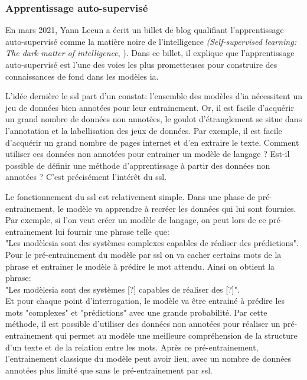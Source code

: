 \subsubsection{Apprentissage auto-supervisé}
En mars 2021, Yann Lecun a écrit un billet de blog qualifiant l'apprentissage auto-supervisé comme la matière noire de l'intelligence \textit{(Self-supervised learning: The dark matter of intelligence}, \cite{lecun_self-supervised_2021}). Dans ce billet, il explique que l'apprentissage auto-supervisé est l'une des voies les plus prometteuses pour construire des connaissances de fond dans les modèles \gls{ia}.


L'idée dernière le \gls{ssl} part d'un constat: l'ensemble des modèles d'\gls{ia} nécessitent un jeu de données bien annotées pour leur entrainement. Or, il est facile d'acquérir un grand nombre de données non annotées, le goulot d'étranglement se situe dans l'annotation et la labellisation des jeux de données. Par exemple, il est facile d'acquérir un grand nombre de pages internet et d'en extraire le texte. Comment utiliser ces données non annotées pour entrainer un modèle de langage ? Est-il possible de définir une méthode d'apprentissage à partir des données non annotées ? C'est précisément l'intérêt du \gls{ssl}.


Le fonctionnement du \gls{ssl} est relativement simple. Dans une phase de pré-entrainement, le modèle va apprendre à recréer les données qui lui sont fournies. Par exemple, si l'on veut créer un modèle de langage, on peut lors de ce pré-entrainement lui fournir une phrase telle que: \\
"Les modèles\gls{ia} sont des systèmes complexes capables de réaliser des prédictions". \\
Pour le pré-entrainement du modèle par \gls{ssl} on va cacher certains mots de la phrase et entrainer le modèle à prédire le mot attendu. Ainsi on obtient la phrase: \\
"Les modèles\gls{ia} sont des systèmes [?] capables de réaliser des [?]". \\
Et pour chaque point d'interrogation, le modèle va être entrainé à prédire les mots "complexes" et "prédictions" avec une grande probabilité. Par cette méthode, il est possible d'utiliser des données non annotées pour réaliser un pré-entrainement qui permet au modèle une meilleure compréhension de la structure d'un texte et de la relation entre les mots. Après ce pré-entrainement, l'entrainement classique du modèle peut avoir lieu, avec un nombre de données annotées plus limité que sans le pré-entrainement par \gls{ssl}.


